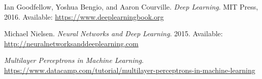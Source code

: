 \begin{thebibliography}{9}

Ian Goodfellow, Yoshua Bengio, and Aaron Courville. 
\textit{Deep Learning}. 
MIT Press, 2016. Available: \url{https://www.deeplearningbook.org}

Michael Nielsen. 
\textit{Neural Networks and Deep Learning}. 
2015. Available: \url{http://neuralnetworksanddeeplearning.com}

\textit{Multilayer Perceptrons in Machine Learning}.  \url{https://www.datacamp.com/tutorial/multilayer-perceptrons-in-machine-learning}


\end{thebibliography}
